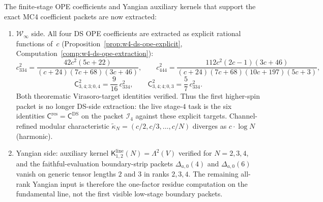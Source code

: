 \begin{remark}
\label{rem:mc4-computational-evidence}
The finite-stage OPE coefficients and Yangian auxiliary kernels
that support the exact MC4 coefficient packets are now extracted:
\begin{enumerate}[label=\textup{(\roman*)},nosep]
\item $\mathcal{W}_\infty$ side.
  All four DS OPE coefficients are extracted as explicit rational
  functions of~$c$
  (Proposition~\ref{prop:w4-ds-ope-explicit},
  Computation~\ref{comp:w4-ds-ope-extraction}):
  \[
  c_{334}^2 = \frac{42c^2(5c+22)}{(c+24)(7c+68)(3c+46)},
  \qquad
  c_{444}^2 = \frac{112c^2(2c-1)(3c+46)}{(c+24)(7c+68)(10c+197)(5c+3)},
  \]
  \[
  \mathsf{C}_{3,4;3;0,4}^2 = \frac{9}{16}\,c_{334}^2,
  \qquad
  \mathsf{C}_{3,4;4;0,3}^2 = \frac{5}{7}\,c_{334}^2.
  \]
  Both theorematic Virasoro-target identities verified.
  Thus the first higher-spin packet is no longer DS-side extraction:
  the live stage-$4$ task is the six identities
  $\mathsf{C}^{\mathrm{res}}=\mathsf{C}^{\mathrm{DS}}$ on the packet
  $\mathcal{I}_4$ against these explicit targets.
  Channel-refined modular characteristic
  $\tilde{\kappa}_N = (c/2, c/3, \ldots, c/N)$ diverges as
  $c \cdot \log N$ (harmonic).
\item Yangian side: auxiliary kernel
  $\mathsf{K}^{\mathrm{line}}_{1,2}(N) = \Lambda^2(V)$ verified for
  $N = 2, 3, 4$, and the faithful-evaluation boundary-strip packets
  $\Delta_{a,0}(4)$ and $\Delta_{a,0}(6)$ vanish on generic tensor
  lengths $2$ and $3$ in ranks $2,3,4$.
  The remaining all-rank Yangian input is therefore the one-factor
  residue computation on the fundamental line, not the first visible
  low-stage boundary packets.
\end{enumerate}
\end{remark}

